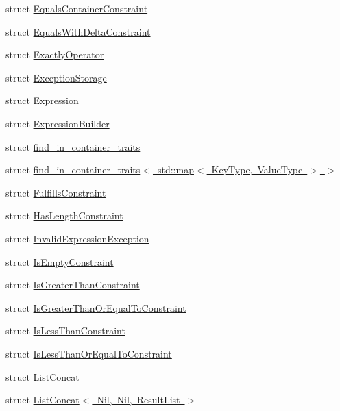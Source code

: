\begin{DoxyCompactItemize}
struct \mbox{\hyperlink{structsnowhouse_1_1EqualsContainerConstraint}{Equals\+Container\+Constraint}}
\item 
struct \mbox{\hyperlink{structsnowhouse_1_1EqualsWithDeltaConstraint}{Equals\+With\+Delta\+Constraint}}
\item 
struct \mbox{\hyperlink{structsnowhouse_1_1ExactlyOperator}{Exactly\+Operator}}
\item 
struct \mbox{\hyperlink{structsnowhouse_1_1ExceptionStorage}{Exception\+Storage}}
\item 
struct \mbox{\hyperlink{structsnowhouse_1_1Expression}{Expression}}
\item 
struct \mbox{\hyperlink{structsnowhouse_1_1ExpressionBuilder}{Expression\+Builder}}
\item 
struct \mbox{\hyperlink{structsnowhouse_1_1find__in__container__traits}{find\+\_\+in\+\_\+container\+\_\+traits}}
\item 
struct \mbox{\hyperlink{structsnowhouse_1_1find__in__container__traits_3_01std_1_1map_3_01KeyType_00_01ValueType_01_4_01_4}{find\+\_\+in\+\_\+container\+\_\+traits$<$ std\+::map$<$ Key\+Type, Value\+Type $>$ $>$}}
\item 
struct \mbox{\hyperlink{structsnowhouse_1_1FulfillsConstraint}{Fulfills\+Constraint}}
\item 
struct \mbox{\hyperlink{structsnowhouse_1_1HasLengthConstraint}{Has\+Length\+Constraint}}
\item 
struct \mbox{\hyperlink{structsnowhouse_1_1InvalidExpressionException}{Invalid\+Expression\+Exception}}
\item 
struct \mbox{\hyperlink{structsnowhouse_1_1IsEmptyConstraint}{Is\+Empty\+Constraint}}
\item 
struct \mbox{\hyperlink{structsnowhouse_1_1IsGreaterThanConstraint}{Is\+Greater\+Than\+Constraint}}
\item 
struct \mbox{\hyperlink{structsnowhouse_1_1IsGreaterThanOrEqualToConstraint}{Is\+Greater\+Than\+Or\+Equal\+To\+Constraint}}
\item 
struct \mbox{\hyperlink{structsnowhouse_1_1IsLessThanConstraint}{Is\+Less\+Than\+Constraint}}
\item 
struct \mbox{\hyperlink{structsnowhouse_1_1IsLessThanOrEqualToConstraint}{Is\+Less\+Than\+Or\+Equal\+To\+Constraint}}
\item 
struct \mbox{\hyperlink{structsnowhouse_1_1ListConcat}{List\+Concat}}
\item 
struct \mbox{\hyperlink{structsnowhouse_1_1ListConcat_3_01Nil_00_01Nil_00_01ResultList_01_4}{List\+Concat$<$ Nil, Nil, Result\+List $>$}}

\end{DoxyCompactItemize}
